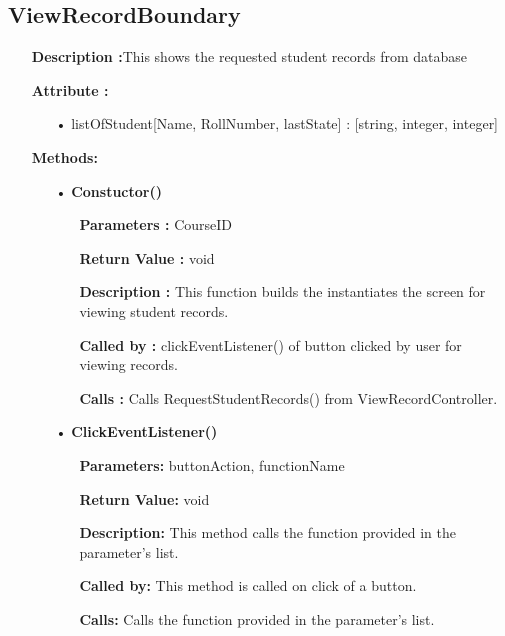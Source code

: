\documentclass{scrreprt}
\begin{document}
\subsection{ViewRecordBoundary}
\begin{enumerate}
\item[] \textbf{Description :}This shows the requested student records from database 
\item[] \textbf{Attribute :}
\begin{itemize}
\item[•] listOfStudent[Name, RollNumber, lastState] : [string, integer, integer]
\end{itemize}
\item [] \textbf{Methods:}
\begin{itemize}
\item [•] \textbf{Constuctor()}
\begin{itemize}
\item [] \textbf{Parameters :}  CourseID
\item [] \textbf{Return Value :} void
\item [] \textbf{Description :} This function builds the instantiates the screen for viewing student records.
\item [] \textbf{Called by :} clickEventListener() of button clicked by user for viewing records.
\item [] \textbf{Calls :} Calls RequestStudentRecords() from ViewRecordController.
\end{itemize}
\end{itemize}
\begin{itemize}
\item [•] \textbf{ClickEventListener()}
\begin{itemize}
\item [] \textbf{Parameters:} buttonAction, functionName 
\item [] \textbf{Return Value:} void
\item [] \textbf{Description:} This method calls the function provided in the parameter's list.
\item [] \textbf{Called by:} This method is called on click of a button.
\item [] \textbf{Calls:} Calls the function provided in the parameter's list.  
\end{itemize}
\end{itemize}
\end{enumerate}
\end{document}
